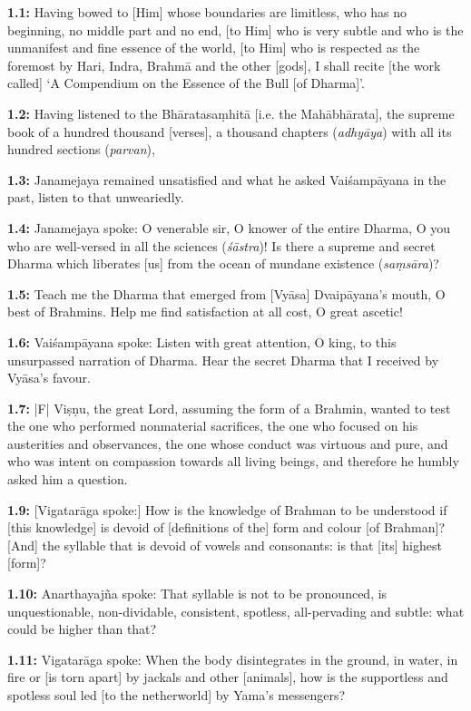 \documentclass{article}
\newcommand{\vsnum}[1]{\textbf{#1}}
\newcommand{\skt}[1]{\textit{#1}}
\begin{document}
\vsnum{1.1:} Having bowed to [Him] whose boundaries are limitless, who has no beginning, no middle part and no end, [to Him] who is very subtle and who is the unmanifest and fine essence of the world, [to Him] who is respected as the foremost by Hari, Indra, Brahmā and the other [gods], I shall recite [the work called] `A Compendium on the Essence of the Bull [of Dharma]'. 

\vsnum{1.2: }Having listened to the Bhāratasaṃhitā [i.e. the Mahābhārata], the supreme book of a hundred thousand [verses], a thousand chapters (\skt{adhyāya}) with all its hundred sections (\skt{parvan}),

\vsnum{1.3: }Janamejaya remained unsatisfied and what he asked Vaiśampāyana in the past, listen to that unweariedly.

\vsnum{1.4: }Janamejaya spoke: O venerable sir, O knower of the entire Dharma, O you who are well-versed in all the sciences (\skt{śāstra})! Is there a supreme and secret Dharma which liberates [us] from the ocean of mundane existence (\skt{saṃsāra})?

\vsnum{1.5: }Teach me the Dharma that emerged from [Vyāsa] Dvaipāyana's mouth, O best of Brahmins. Help me find satisfaction at all cost, O great ascetic!

\vsnum{1.6: }Vaiśampāyana spoke: Listen with great attention, O king, to this unsurpassed narration of Dharma. Hear the secret Dharma that I received by Vyāsa's favour.

\vsnum{1.7: }|F| Viṣṇu, the great Lord, assuming the form of a Brahmin, wanted to test the one who performed nonmaterial sacrifices, the one who focused on his austerities and observances, the one whose conduct was virtuous and pure, and who was intent on compassion towards all living beings, and therefore he humbly asked him a question.

\vsnum{1.9: }[Vigatarāga spoke:] How is the knowledge of Brahman to be understood if [this knowledge] is devoid of [definitions of the] form and colour [of Brahman]? [And] the syllable that is devoid of vowels and consonants: is that [its] highest [form]?

\vsnum{1.10: }Anarthayajña spoke: That syllable is not to be pronounced, is unquestionable, non-dividable, consistent, spotless, all-pervading and subtle: what could be higher than that?

\vsnum{1.11: }Vigatarāga spoke: When the body disintegrates in the ground, in water, in fire or [is torn apart] by jackals and other [animals], how is the supportless and spotless soul led [to the netherworld] by Yama's messengers?
\end{document}
